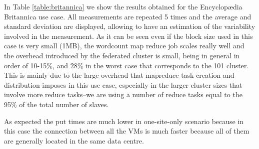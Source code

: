\documentclass[oribibl]{llncs_Ibergrid2013}
\begin{document}
In Table \ref{table:britannica} we show the results obtained for the Encyclop{\ae}dia Britannica use case. All measurements are repeated 5 times and the average and standard deviation are displayed, allowing to have an estimation of the variability involved in the measurement. As it can be seen even if the block size used in this case is very small (1MB), the wordcount map reduce job scales really well and the overhead introduced by the federated cluster is small, being in general in order of 10-15\%, and 28\% in the worst case that corresponds to the 101 cluster. This is mainly due to the large overhead that mapreduce task creation and distribution imposes in this use case, especially in the larger cluster sizes that involve more reduce tasks--we are using a number of reduce tasks equal to the 95\% of the total number of slaves.

As expected the put times are much lower in one-site-only scenario because in this case the connection between all the VMs is much faster because all of them are generally located in the same data centre.
\end{document}
